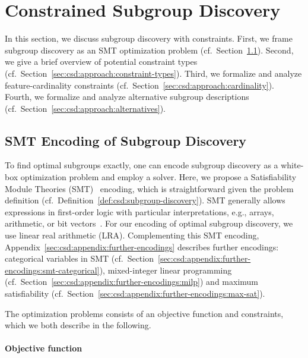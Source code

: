 \documentclass{article}
\theoremstyle{definition}
\begin{document}
\section{Constrained Subgroup Discovery}
\label{sec:csd:approach}

In this section, we discuss subgroup discovery with constraints.
First, we frame subgroup discovery as an SMT optimization problem (cf.~Section~\ref{sec:csd:approach:smt}).
Second, we give a brief overview of potential constraint types (cf.~Section~\ref{sec:csd:approach:constraint-types}).
Third, we formalize and analyze feature-cardinality constraints (cf.~Section~\ref{sec:csd:approach:cardinality}).
Fourth, we formalize and analyze alternative subgroup descriptions (cf.~Section~\ref{sec:csd:approach:alternatives}).

\subsection{SMT Encoding of Subgroup Discovery}
\label{sec:csd:approach:smt}

To find optimal subgroups exactly, one can encode subgroup discovery as a white-box optimization problem and employ a solver.
Here, we propose a Satisfiability Module Theories (SMT)~\cite{barrett2018satisfiability} encoding, which is straightforward given the problem definition (cf.~Definition~\ref{def:csd:subgroup-discovery}).
SMT generally allows expressions in first-order logic with particular interpretations, e.g., arrays, arithmetic, or bit vectors~\cite{barrett2018satisfiability}.
For our encoding of optimal subgroup discovery, we use linear real arithmetic (LRA).
Complementing this SMT encoding, Appendix~\ref{sec:csd:appendix:further-encodings} describes further encodings:
categorical variables in SMT (cf.~Section~\ref{sec:csd:appendix:further-encodings:smt-categorical}), mixed-integer linear programming (cf.~Section~\ref{sec:csd:appendix:further-encodings:milp}) and maximum satisfiability (cf.~Section~\ref{sec:csd:appendix:further-encodings:max-sat}).

The optimization problems consists of an objective function and constraints, which we both describe in the following.

\paragraph{Objective function}
\end{document}
